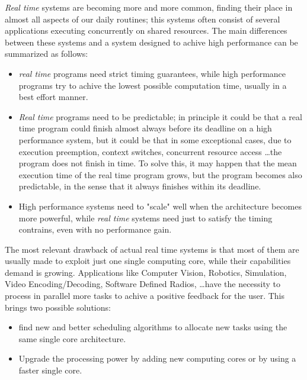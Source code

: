 \documentclass[a4paper,12pt,oneside]{book}
\begin{document}
\emph{Real time} systems are becoming more and more common, finding their place in almost all aspects of our daily routines; this systems often consist of several applications executing concurrently on shared resources. 
The main differences between these systems and a system designed to achive high performance can be summarized as follows:
\begin{itemize}
\item{ \emph{real time} programs need strict timing guarantees, while high performance programs try to achive the lowest possible computation time, usually in a best effort manner.}
\item{\emph{Real time} programs need to be predictable; in principle it could be that a real time program could finish almost always before its deadline on a high performance system, but it could be that in some exceptional cases, due to execution preemption, context switches, concurrent resource access \dots the program does not finish in time. To solve this, it may happen that the mean execution time of the real time program grows, but the program becomes also predictable, in the sense that it always finishes within its deadline.}
\item{ High performance systems need to "scale" well when the architecture becomes more powerful, while \emph{real time} systems need just to satisfy the timing contrains, even with no performance gain.}

\end{itemize}

The most relevant drawback of actual real time systems is that most of them are usually made to exploit just one single computing core, while their capabilities demand is growing. Applications like Computer Vision, Robotics, Simulation, Video Encoding/Decoding, Software Defined Radios, \dots have the necessity to process in parallel more tasks to achive a positive feedback for the user. This brings two possible solutions:
\begin{itemize}
\item{find new and better scheduling algorithms to allocate new tasks using the same single core architecture.}
\item{Upgrade the processing power by adding new computing cores or by using a faster single core.}
\end{itemize}
\end{document}
